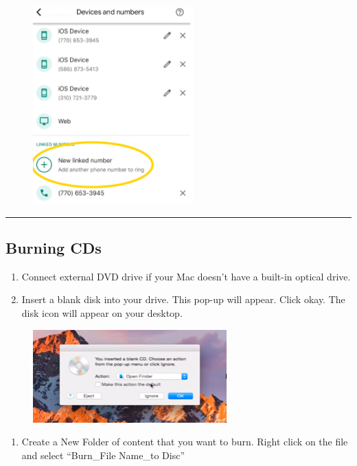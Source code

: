 \documentclass[]{book}
\providecommand{\tightlist}{%
  \setlength{\itemsep}{0pt}\setlength{\parskip}{0pt}}
\begin{document}
\begin{figure}
\centering
\includegraphics{images/research_protocols/google_voice/pic7.png}
\caption{}
\end{figure}

\begin{center}\rule{0.5\linewidth}{0.5pt}\end{center}

\hypertarget{burning-cds}{%
\subsection{Burning CDs}\label{burning-cds}}

\begin{enumerate}
\def\labelenumi{\arabic{enumi}.}
\item
  Connect external DVD drive if your Mac doesn't have a built-in optical drive.
\item
  Insert a blank disk into your drive. This pop-up will appear. Click okay. The disk icon will appear on your desktop.
\end{enumerate}

\begin{figure}
\centering
\includegraphics{images/lab_protocols/cd_burning/1.png}
\caption{}
\end{figure}

\begin{enumerate}
\def\labelenumi{\arabic{enumi}.}
\setcounter{enumi}{2}
\tightlist
\item
  Create a New Folder of content that you want to burn. Right click on the file and select ``Burn\_File Name\_to Disc''
\end{enumerate}
\end{document}
